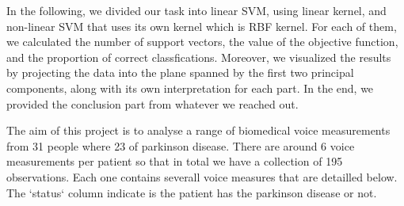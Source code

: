 In the following, we divided our task into linear SVM, using linear kernel, and non-linear SVM that uses its own kernel which is RBF kernel. For each of them, we calculated the number of support vectors, the value of the objective function, and the proportion of correct classfications. Moreover, we visualized the results by projecting the data into the plane spanned by the first two principal components, along with its own interpretation for each part. In the end, we provided the conclusion part from whatever we reached out.

The aim of this project is to analyse a range of biomedical voice measurements from 31 people where 23 of parkinson disease. There are around 6 voice measurements per patient so that in total we have a collection of 195 observations. Each one contains severall voice measures that are detailled below. The `status` column indicate is the patient has the parkinson disease or not.